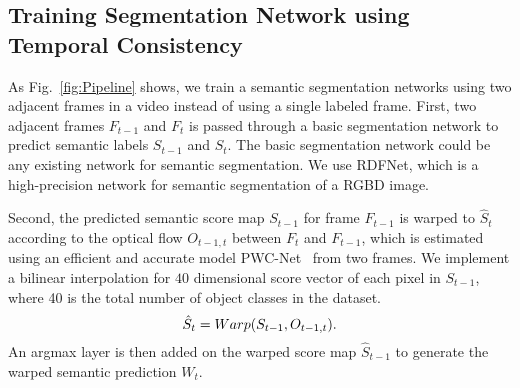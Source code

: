 \subsection{Training Segmentation Network using Temporal Consistency}
%
As Fig.~\ref{fig:Pipeline} shows, we train a semantic segmentation networks using two adjacent frames in a video instead of using a single labeled frame.  
% 
First, two adjacent frames $F_{t-1}$ and $F_t$ is passed through a basic segmentation network to predict semantic labels $S_{t-1}$ and $S_{t}$.
%
The basic segmentation network could be any existing network for semantic segmentation. 
We use RDFNet\cite{Park2017}, which is a high-precision network for semantic segmentation of a RGBD image.



Second, the predicted semantic score map $S_{t-1}$ for frame $F_{t-1}$ is warped to $\hat{S}_{t}$ according to the optical flow $O_{t-1,t}$ between $F_t$ and $F_{t-1}$, which is estimated using an efficient and accurate model PWC-Net~\cite{Sun2018} from two frames. 
We implement a bilinear interpolation for $40$ dimensional score vector of each pixel in $S_{t-1}$, where 40 is the total number of object classes in the dataset. 
\begin{equation}
\centering
\hat{S}_{t}=Warp(S_{t-1},O_{t-1,t}).
\end{equation}
%
An argmax layer is then added on the warped score map ${\hat{S}_{t-1}}$ to generate the warped semantic prediction $W_{t}$.


